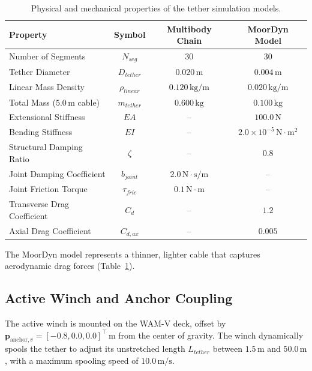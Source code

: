     \begin{table}[H]
        \centering
        \caption{Physical and mechanical properties of the tether simulation models.}
        \label{tab:tether_parameters}
        \begin{tabular}{lccc}
            \toprule
            \textbf{Property} & \textbf{Symbol} & \textbf{Multibody Chain} & \textbf{MoorDyn Model} \\
            \midrule
            Number of Segments & $N_{seg}$ & $30$ & $30$ \\
            Tether Diameter & $D_{tether}$ & $0.020\,\text{m}$ & $0.004\,\text{m}$ \\
            Linear Mass Density & $\rho_{linear}$ & $0.120\,\text{kg/m}$ & $0.020\,\text{kg/m}$ \\
            Total Mass ($5.0\,\text{m}$ cable) & $m_{tether}$ & $0.600\,\text{kg}$ & $0.100\,\text{kg}$ \\
            Extensional Stiffness & $EA$ & -- & $100.0\,\text{N}$ \\
            Bending Stiffness & $EI$ & -- & $2.0 \times 10^{-5}\,\text{N}\cdot\text{m}^2$ \\
            Structural Damping Ratio & $\zeta$ & -- & $0.8$ \\
            Joint Damping Coefficient & $b_{joint}$ & $2.0\,\text{N}\cdot\text{s/m}$ & -- \\
            Joint Friction Torque & $\tau_{fric}$ & $0.1\,\text{N}\cdot\text{m}$ & -- \\
            Transverse Drag Coefficient & $C_d$ & -- & $1.2$ \\
            Axial Drag Coefficient & $C_{d,ax}$ & -- & $0.005$ \\
            \bottomrule
        \end{tabular}
    \end{table}

    The MoorDyn model represents a thinner, lighter cable that captures aerodynamic drag forces (Table~\ref{tab:tether_parameters}).

    \subsection{Active Winch and Anchor Coupling}
    \label{sec:sim_moordyn_integration}
    The active winch is mounted on the WAM-V deck, offset by $\mathbf{p}_{\mathrm{anchor}, v} = [-0.8, 0.0, 0.0]^\top\,\text{m}$ from the center of gravity. The winch dynamically spools the tether to adjust its unstretched length $L_{tether}$ between $1.5\,\text{m}$ and $50.0\,\text{m}$, with a maximum spooling speed of $10.0\,\text{m/s}$.
    
